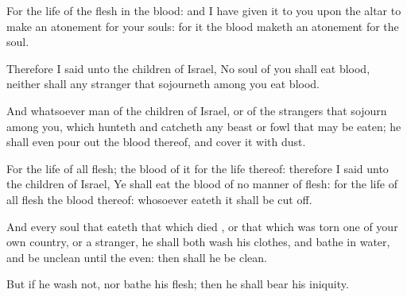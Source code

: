 {For the
life of the
flesh
{} in the
blood: and I have
given it to you upon the
altar to make an
atonement for your
souls: for it
{} the
blood
{} maketh an
atonement for the
soul.

Therefore I
said unto the
children of
Israel, No
soul of you shall
eat
blood, neither shall any
stranger that
sojourneth
among you
eat
blood.

And whatsoever
man
{} of the
children of
Israel, or of the
strangers that
sojourn
among you, which
hunteth and
catcheth any
beast or
fowl that may be
eaten; he shall even
pour out the
blood thereof, and
cover it with
dust.

For
{} the
life of all
flesh; the
blood of it
{} for the
life thereof: therefore I
said unto the
children of
Israel, Ye shall
eat the
blood of no manner of
flesh: for the
life of all
flesh
{} the
blood thereof: whosoever
eateth it shall be cut
off.

And every
soul that
eateth that which
died
{}, or that which was
torn
{} one of your own
country, or a
stranger, he shall both
wash his
clothes, and
bathe
{} in
water, and be
unclean until the
even: then shall he be
clean.

But if he
wash
{} not, nor
bathe his
flesh; then he shall
bear his
iniquity.




\par }
